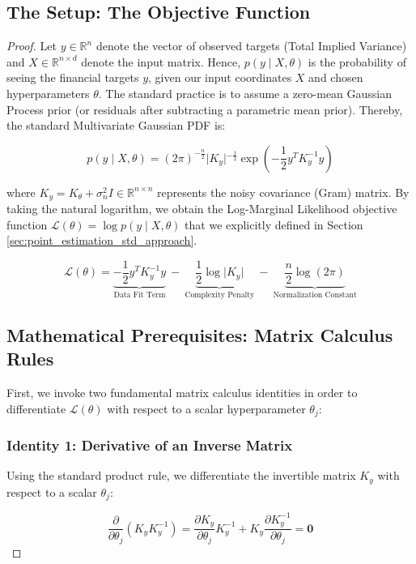 \documentclass[12pt,oneside]{report}
\theoremstyle{definition}
\theoremstyle{remark}
\begin{document}
\subsection{The Setup: The Objective Function}
\begin{proof}
Let $y \in \mathbb{R}^n$ denote the vector of observed targets (Total Implied Variance) and $X \in \mathbb{R}^{n \times d}$ denote the input matrix. Hence, $p(y \mid X, \theta)$ is the probability of seeing the financial targets $y$, given our input coordinates $X$ and chosen hyperparameters $\theta$. The standard practice is to assume a zero-mean Gaussian Process prior (or residuals after subtracting a parametric mean prior). Thereby, the standard Multivariate Gaussian PDF is:

$$p(y \mid X, \theta) = (2\pi)^{-\frac{n}{2}} \vert{}K_y\vert{}^{-\frac{1}{2}} \exp \left( -\frac{1}{2} y^T K_y^{-1} y \right)$$

where $K_y = K_\theta + \sigma_n^2 I \in \mathbb{R}^{n \times n}$ represents the noisy covariance (Gram) matrix. By taking the natural logarithm, we obtain the Log-Marginal Likelihood objective function $\mathcal{L}(\theta) = \log p(y \mid X, \theta)$ that we explicitly defined in Section \ref{sec:point_estimation_std_approach}.

\begin{equation}
\mathcal{L}(\theta) = \underbrace{-\frac{1}{2} y^T K_y^{-1} y}_{\text{Data Fit Term}} \ - \ \underbrace{\frac{1}{2} \log \vert{}K_y\vert{}}_{\text{Complexity Penalty}} \ - \ \underbrace{\frac{n}{2} \log (2\pi)}_{\text{Normalization Constant}}
\label{eq:lml_objective_function}
\end{equation}

\subsection{Mathematical Prerequisites: Matrix Calculus Rules}
First, we invoke two fundamental matrix calculus identities in order to differentiate $\mathcal{L}(\theta)$ with respect to a scalar hyperparameter $\theta_j$:

\subsubsection{Identity 1: Derivative of an Inverse Matrix}
Using the standard product rule, we differentiate the invertible matrix $K_y$ with respect to a scalar $\theta_j$:

\begin{equation}
\frac{\partial}{\partial \theta_j} (K_y K_y^{-1}) = \frac{\partial K_y}{\partial \theta_j} K_y^{-1} + K_y \frac{\partial K_y^{-1}}{\partial \theta_j} = \mathbf{0}
\label{eq:derivative_inverse_matrix}
\end{equation}


\end{proof}
\end{document}
